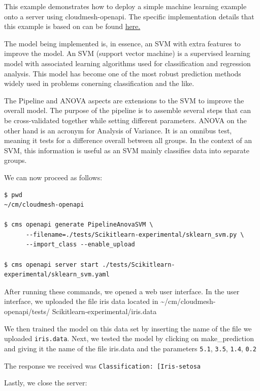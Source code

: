 This example demonstrates how to deploy a simple machine learning
example onto a server using cloudmesh-openapi. The specific
implementation details that this example is based on can be found
\href{https://scikit-learn.org/stable/auto_examples/feature_selection/plot_feature_selection_pipeline.html}{here.}

The model being implemented is, in essence, an SVM with extra features
to improve the model. An SVM (support vector machine) is a supervised
learning model with associated learning algorithms used for
classification and regression analysis. This model has become one of the
most robust prediction methods widely used in problems conerning
classification and the like.

The Pipeline and ANOVA aspects are extensions to the SVM to improve the
overall model. The purpose of the pipeline is to assemble several steps
that can be cross-validated together while setting different parameters.
ANOVA on the other hand is an acronym for Analysis of Variance. It is an
omnibus test, meaning it tests for a difference overall between all
groups. In the context of an SVM, this information is useful as an SVM
mainly classifies data into separate groups.

We can now proceed as follows:

\begin{verbatim}
$ pwd
~/cm/cloudmesh-openapi

$ cms openapi generate PipelineAnovaSVM \
      --filename=./tests/Scikitlearn-experimental/sklearn_svm.py \
      --import_class --enable_upload

$ cms openapi server start ./tests/Scikitlearn-experimental/sklearn_svm.yaml
\end{verbatim}

After running these commands, we opened a web user interface. In the
user interface, we uploaded the file iris data located in
\textasciitilde/cm/cloudmesh-openapi/tests/
Scikitlearn-experimental/iris.data

We then trained the model on this data set by inserting the name of the
file we uploaded \texttt{iris.data}. Next, we tested the model by
clicking on make\_prediction and giving it the name of the file
iris.data and the parameters \texttt{5.1}, \texttt{3.5}, \texttt{1.4},
\texttt{0.2}

The response we received was
\texttt{Classification:\ {[}\textquotesingle{}Iris-setosa\textquotesingle{}{]}}

Lastly, we close the server:

